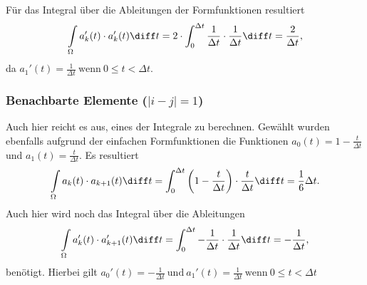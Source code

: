 Für das Integral über die Ableitungen der Formfunktionen resultiert
\begin{equation}
    \int\limits_\Omega a_k'(t) \cdot a_k'(t) \diff t = 2 \cdot \int_{0}^{\Delta t} \frac{1}{\Delta t} \cdot \frac{1}{\Delta t} \diff t = \frac{2}{\Delta t},
\end{equation}
da $a_1'(t)= \frac{1}{\Delta t} \ \text{wenn} \ 0 \leq t < \Delta t$.

\subsubsection{Benachbarte Elemente ($|i - j| = 1$)}
Auch hier reicht es aus, eines der Integrale zu berechnen. 
Gewählt wurden ebenfalls aufgrund der einfachen Formfunktionen die Funktionen $a_0(t) = 1 - \frac{t}{\Delta t}$ und $a_1(t) = \frac{t}{\Delta t}$.
Es resultiert
\begin{equation}
    \int\limits_\Omega a_k(t) \cdot a_{k+1}(t) \diff t = \int_{0}^{\Delta t} \left(1 - \frac{t}{\Delta t}\right) \cdot \frac{t}{\Delta t} \diff t = \frac{1}{6} \Delta t.
\end{equation}
Auch hier wird noch das Integral über die Ableitungen 
\begin{equation}
    \int\limits_\Omega a_k'(t) \cdot a_{k+1}'(t) \diff t = \int_{0}^{\Delta t} -\frac{1}{\Delta t} \cdot \frac{1}{\Delta t} \diff t = -\frac{1}{\Delta t},
\end{equation}
benötigt.
Hierbei gilt $a_0'(t)= -\frac{1}{\Delta t} \ \text{und} \ a_1'(t)= \frac{1}{\Delta t} \ \text{wenn} \ 0 \leq t < \Delta t$

